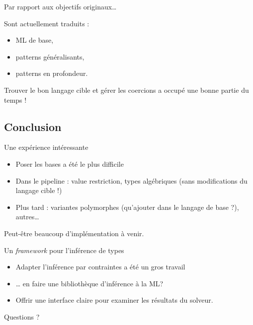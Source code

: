 \documentclass[final]{beamer}
\begin{document}
\begin{frame}{Par rapport aux objectifs originaux\dots}

  Sont actuellement traduits :
  \begin{itemize}
    \item ML de base,
    \item patterns généralisants,
    \item patterns en profondeur.
  \end{itemize}

  Trouver le bon langage cible et gérer les coercions a occupé une bonne partie
  du temps !

\end{frame}

\subsection{Conclusion}

\begin{frame}{Une expérience intéressante}
  \begin{itemize}
    \item Poser les bases a été le plus difficile
    \item Dans le pipeline : value restriction, types algébriques (sans
      modifications du langage cible !)
    \item Plus tard : variantes polymorphes (qu'ajouter dans le langage de
      base ?), autres…
  \end{itemize}

  Peut-être beaucoup d'implémentation à venir.
\end{frame}

\begin{frame}{Un \emph{framework} pour l'inférence de types}
  \begin{itemize}
    \item Adapter l'inférence par contraintes a été un gros travail
    \item … en faire une bibliothèque d'inférence à la ML?
    \item Offrir une interface claire pour examiner les résultats du solveur. 
  \end{itemize}
\end{frame}


\begin{frame}
  \begin{center}
    \Huge
    Questions ?
  \end{center}
\end{frame}
\end{document}
